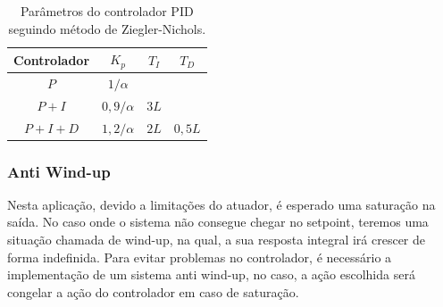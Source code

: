 \begin{table}[H]
    \begin{center}
        \begin{tabular}{ |c|c|c|c| } 
            \hline
            Controlador & \(K_p\) & \(T_I\) & \(T_D\) \\
            \hline
            \(P\) & \(1/\alpha\) &  & \\
            \hline
            \(P + I\) & \(0,9/\alpha\) & \(3L\) & \\
            \hline
            \(P + I + D\) & \(1,2/\alpha\) & \(2L\) & \(0,5L\) \\
            \hline
        \end{tabular}
        \caption{\label{tab:parametros_ziegler} Parâmetros do controlador PID seguindo método de Ziegler-Nichols.}
    \end{center}
\end{table}



\subsubsection{Anti Wind-up}


Nesta aplicação, devido a limitações do atuador, é esperado uma saturação na saída. No caso onde o sistema não consegue chegar no setpoint, teremos uma situação chamada de wind-up, na qual, a sua resposta integral irá crescer de forma indefinida. Para evitar problemas no controlador, é necessário a implementação de um sistema anti wind-up, no caso, a ação escolhida será congelar a ação do controlador em caso de saturação.  


